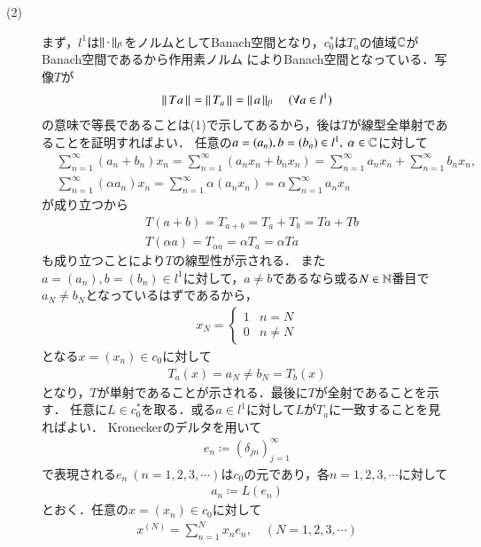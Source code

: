 \begin{prf}
\begin{description}
	\item[(2)] まず，$l^1$は$\left\|\, \cdot\, \right\|_{l^1}$をノルムとしてBanach空間となり，$c_0^*$は$T_a$の値域$\mathbb{C}$がBanach空間であるから作用素ノルム
		によりBanach空間となっている．写像$T$が
		\begin{align}
			\left\|\, Ta\, \right\|_{} = \left\|\, T_a\, \right\|_{} = \left\|\, a\, \right\|_{l^1}\quad (\forall a \in l^1)
		\end{align}
		の意味で等長であることは(1)で示してあるから，後は$T$が線型全単射であることを証明すればよい．
		任意の$a = (a_n), b=(b_n) \in l^1,\ \alpha \in \mathbb{C}$に対して
		\begin{align}
			&\sum_{n=1}^{\infty} (a_n + b_n) x_n 
			= \sum_{n=1}^{\infty} (a_n x_n + b_n x_n) 
			=  \sum_{n=1}^{\infty} a_n x_n + \sum_{n=1}^{\infty} b_n x_n, \\
			&\sum_{n=1}^{\infty} (\alpha a_n) x_n
			= \sum_{n=1}^{\infty} \alpha (a_n x_n)
			= \alpha \sum_{n=1}^{\infty} a_n x_n
		\end{align}
		が成り立つから
		\begin{align}
			&T(a+b) = T_{a+b} = T_a + T_b = Ta + Tb \\
			&T(\alpha a) = T_{\alpha a} = \alpha T_a = \alpha Ta
		\end{align}
		も成り立つことにより$T$の線型性が示される．
		また$a = (a_n), b=(b_n) \in l^1$に対して，$a \neq b$であるなら或る$N \in \mathbb{N}$番目で
		$a_N \neq b_N$となっているはずであるから，
		\begin{align}
			x_N = \begin{cases}
				1 & n=N \\
				0 & n \neq N
			\end{cases}
		\end{align}
		となる$x=(x_n) \in c_0$に対して
		\begin{align}
			T_a(x) = a_N \neq b_N = T_b(x)
		\end{align}
		となり，$T$が単射であることが示される．最後に$T$が全射であることを示す．
		任意に$L \in c_0^*$を取る．或る$a \in l^1$に対して$L$が$T_a$に一致することを見ればよい．
		Kroneckerのデルタを用いて
		\begin{align}
			e_n \coloneqq (\delta_{jn})_{j=1}^{\infty}
		\end{align}
		で表現される$e_n\ (n=1,2,3,\cdots)$は$c_0$の元であり，各$n = 1,2,3,\cdots$に対して
		\begin{align}
			a_n \coloneqq L(e_n) \label{eq:def_a_n_in_l1}
		\end{align}
		とおく．任意の$x=(x_n) \in c_0$に対して
		\begin{align}
			x^{(N)} = \sum_{n=1}^{N} x_n e_n, \quad (N = 1,2,3,\cdots)

\end{align}
\end{description}
\end{prf}
